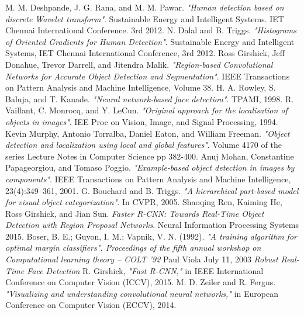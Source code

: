 \begin{thebibliography}{1}

M. M. Deshpande, J. G. Rana, and M. M. Pawar. \emph{"Human detection based on discrete Wavelet transform"}. Sustainable Energy and Intelligent Systems. IET Chennai International Conference. 3rd 2012.
N. Dalal and  B. Triggs. \emph{"Histograms of Oriented Gradients for Human Detection"}. Sustainable Energy and Intelligent Systems, IET Chennai International Conference, 3rd 2012.
Ross Girshick, Jeff Donahue, Trevor Darrell, and Jitendra Malik. \emph{"Region-based Convolutional Networks for Accurate Object Detection and Segmentation"}. IEEE Transactions on Pattern Analysis and Machine Intelligence, Volume 38.
H. A. Rowley, S. Baluja, and T. Kanade. \emph{"Neural network-based face detection"}. TPAMI, 1998.
R. Vaillant, C. Monrocq, and Y. LeCun. \emph{"Original approach for the localisation of objects in images"}. IEE Proc on Vision, Image, and
Signal Processing, 1994.
Kevin Murphy, Antonio Torralba, Daniel Eaton, and William Freeman. \emph{"Object detection and localization using local and global features"}. Volume 4170 of the series Lecture Notes in Computer Science pp 382-400.
Anuj Mohan, Constantine Papageorgiou, and Tomaso Poggio. \emph{"Example-based object detection in images by components"}. IEEE Transactions on Pattern Analysis and Machine Intelligence, 23(4):349–361, 2001.
G. Bouchard and B. Triggs. \emph{"A hierarchical part-based model for visual object categorization"}. In CVPR, 2005.
Shaoqing Ren, Kaiming He, Ross Girshick, and Jian Sun. \emph{Faster R-CNN: Towards Real-Time Object	Detection with Region Proposal Networks}. Neural Information Processing Systems 2015.
Boser, B. E.; Guyon, I. M.; Vapnik, V. N. (1992). \emph{"A training algorithm for optimal margin classifiers". Proceedings of the fifth annual workshop on Computational learning theory – COLT '92}
Paul Viola July 11, 2003 \emph{Robust Real-Time Face Detection}
R. Girshick, \emph{"Fast R-CNN,"} in IEEE International Conference on Computer Vision (ICCV), 2015.
M. D. Zeiler and R. Fergus. \emph{"Visualizing and understanding convolutional neural networks,"} in European Conference on
Computer Vision (ECCV), 2014.
\end{thebibliography}